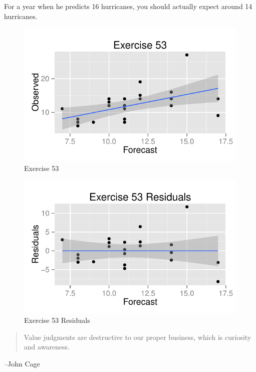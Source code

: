 \documentclass[letterpaper]{exam}
\begin{document}
\begin{description}
        For a year when he predicts 16 hurricanes, you should actually expect
        around 14 hurricanes.

        \begin{figure}[H]
          \centering
          \includegraphics{figures/ex53.pdf}
          \caption{Exercise 53}
        \end{figure}

        \begin{figure}[H]
          \centering
          \includegraphics{figures/ex53_residuals.pdf}
          \caption{Exercise 53 Residuals}
        \end{figure}

    \end{description}

  \else
    \vspace{12 cm}
    \begin{quote}
      \begin{em}
        Value judgments are destructive to our proper business, which is
        curiosity and awareness. 
      \end{em}
    \end{quote}
    \hspace{1 cm} --John Cage
  \fi
\end{document}
